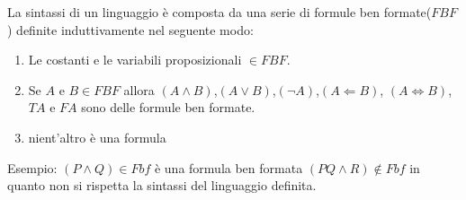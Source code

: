 La sintassi di un linguaggio è composta da una serie di formule ben formate($FBF$) definite
induttivamente nel seguente modo:

\begin{enumerate}
  \item Le costanti e le variabili proposizionali $\in FBF$.
  \item Se $A$ e $B \in FBF$ allora $(A \land B)$,$(A \lor B)$,$(\neg A)$,$(A \Leftarrow B)$,
        $(A \iff B)$,$TA$ e $FA$ sono delle formule ben formate.
  \item nient'altro è una formula
\end{enumerate}

Esempio:\newline
$(P \land Q) \in Fbf$  è una formula ben formata\newline
$(PQ \land R) \not \in Fbf$ in quanto non si rispetta la sintassi del linguaggio definita.\newline


